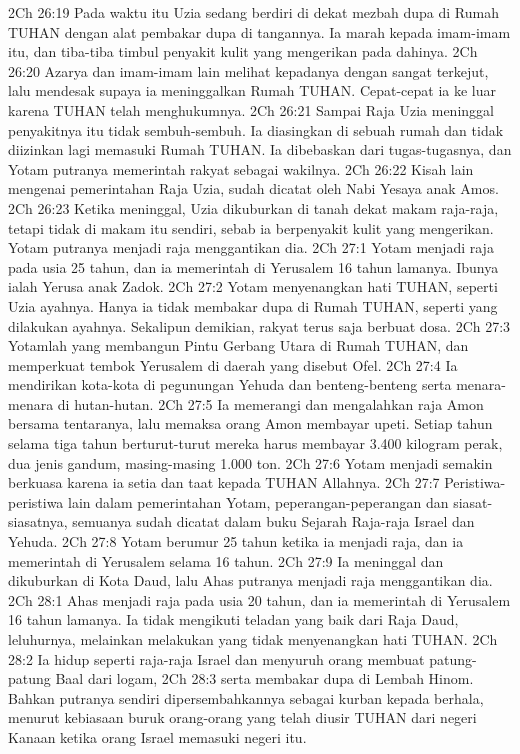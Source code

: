 2Ch 26:19  Pada waktu itu Uzia sedang berdiri di dekat mezbah dupa di Rumah TUHAN dengan alat pembakar dupa di tangannya. Ia marah kepada imam-imam itu, dan tiba-tiba timbul penyakit kulit yang mengerikan pada dahinya.
2Ch 26:20  Azarya dan imam-imam lain melihat kepadanya dengan sangat terkejut, lalu mendesak supaya ia meninggalkan Rumah TUHAN. Cepat-cepat ia ke luar karena TUHAN telah menghukumnya.
2Ch 26:21  Sampai Raja Uzia meninggal penyakitnya itu tidak sembuh-sembuh. Ia diasingkan di sebuah rumah dan tidak diizinkan lagi memasuki Rumah TUHAN. Ia dibebaskan dari tugas-tugasnya, dan Yotam putranya memerintah rakyat sebagai wakilnya.
2Ch 26:22  Kisah lain mengenai pemerintahan Raja Uzia, sudah dicatat oleh Nabi Yesaya anak Amos.
2Ch 26:23  Ketika meninggal, Uzia dikuburkan di tanah dekat makam raja-raja, tetapi tidak di makam itu sendiri, sebab ia berpenyakit kulit yang mengerikan. Yotam putranya menjadi raja menggantikan dia.
2Ch 27:1  Yotam menjadi raja pada usia 25 tahun, dan ia memerintah di Yerusalem 16 tahun lamanya. Ibunya ialah Yerusa anak Zadok.
2Ch 27:2  Yotam menyenangkan hati TUHAN, seperti Uzia ayahnya. Hanya ia tidak membakar dupa di Rumah TUHAN, seperti yang dilakukan ayahnya. Sekalipun demikian, rakyat terus saja berbuat dosa.
2Ch 27:3  Yotamlah yang membangun Pintu Gerbang Utara di Rumah TUHAN, dan memperkuat tembok Yerusalem di daerah yang disebut Ofel.
2Ch 27:4  Ia mendirikan kota-kota di pegunungan Yehuda dan benteng-benteng serta menara-menara di hutan-hutan.
2Ch 27:5  Ia memerangi dan mengalahkan raja Amon bersama tentaranya, lalu memaksa orang Amon membayar upeti. Setiap tahun selama tiga tahun berturut-turut mereka harus membayar 3.400 kilogram perak, dua jenis gandum, masing-masing 1.000 ton.
2Ch 27:6  Yotam menjadi semakin berkuasa karena ia setia dan taat kepada TUHAN Allahnya.
2Ch 27:7  Peristiwa-peristiwa lain dalam pemerintahan Yotam, peperangan-peperangan dan siasat-siasatnya, semuanya sudah dicatat dalam buku Sejarah Raja-raja Israel dan Yehuda.
2Ch 27:8  Yotam berumur 25 tahun ketika ia menjadi raja, dan ia memerintah di Yerusalem selama 16 tahun.
2Ch 27:9  Ia meninggal dan dikuburkan di Kota Daud, lalu Ahas putranya menjadi raja menggantikan dia.
2Ch 28:1  Ahas menjadi raja pada usia 20 tahun, dan ia memerintah di Yerusalem 16 tahun lamanya. Ia tidak mengikuti teladan yang baik dari Raja Daud, leluhurnya, melainkan melakukan yang tidak menyenangkan hati TUHAN.
2Ch 28:2  Ia hidup seperti raja-raja Israel dan menyuruh orang membuat patung-patung Baal dari logam,
2Ch 28:3  serta membakar dupa di Lembah Hinom. Bahkan putranya sendiri dipersembahkannya sebagai kurban kepada berhala, menurut kebiasaan buruk orang-orang yang telah diusir TUHAN dari negeri Kanaan ketika orang Israel memasuki negeri itu.
